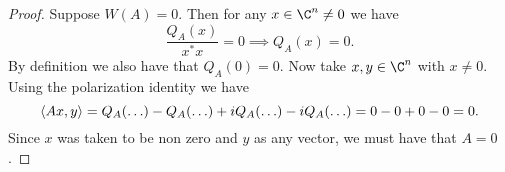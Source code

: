 \documentclass{article}
\begin{document}
\begin{proof}
    Suppose $W(A) = \qty{0}$. Then for any $x \in \C^n \neq 0$ we have
    \[
        \frac{Q_A(x)}{x^* x} = 0 \implies Q_A(x) = 0
    .\]
    By definition we also have that $Q_A(0) = 0$. Now take $x,y \in \C^n$ with $x \neq 0$. Using the polarization identity we have
    \[
        \iprd{Ax, y} = Q_A(\ldots) - Q_A(\ldots) + i Q_A(\ldots) - i Q_A(\ldots) = 0 - 0 + 0 - 0 = 0
    .\]
    Since $x$ was taken to be non zero and $y$ as any vector, we must have that $A = 0$.

\end{proof}
\end{document}
